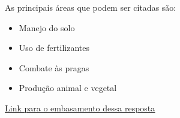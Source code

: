 As principais áreas que podem ser citadas são:

\begin{itemize}
	\item Manejo do solo
	\item Uso de fertilizantes
	\item Combate às pragas
	\item Produção animal e vegetal
\end{itemize}

\href{https://www.esalq.usp.br/graduacao/cursos/engenharia-agronomica}{\underline{Link para o embasamento dessa resposta}}
\newpage